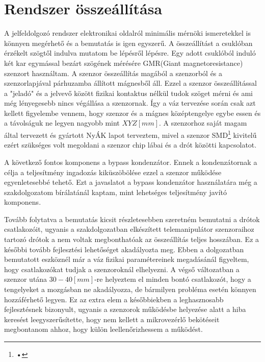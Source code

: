 \section{Rendszer összeállítása}

A jelfeldolgozó rendszer elektronikai oldalról minimális mérnöki ismeretekkel is könnyen megérhető és a bemutatás is igen egyszerű. A összeállítást a csuklóban érzékelt szögtől indulva mutatom be lépésről lépésre. Egy adott csuklóból induló két kar egymással bezárt szögének mérésére GMR(Giant magnetoresistance) szenzort használtam. A szenzor összeállítás magából a szenzorból és a szenzorlapjával párhuzamba állított mágnesből áll. Ezzel a szenzor összeállítással a "jeladó" és a jelvevő között fizikai kontaktus nélkül tudok szöget mérni és ami még lényegesebb nincs végállása a szenzornak. Így a váz tervezése során csak azt kellett figyelembe vennem, hogy szenzor és a mágnes középtengelye egybe essen és a távolságuk ne legyen nagyobb mint $XYZ[mm]$. A szenzorhoz saját magam által tervezett és gyártott NyÁK lapot terveztem, mivel a szenzor SMD\footnote{•} kivitelű ezért szükséges volt megoldani a szenzor chip lábai és a drót közötti kapcsolatot.


A következő fontos komponens a bypass kondenzátor. Ennek a kondenzátornak a célja a teljesítmény ingadozás kiküszöbölése ezzel a szenzor működése egyenletesebbé tehető. Ezt a javaslatot a bypass kondenzátor használatára még a szakdolgozatom bírálatánál kaptam, mint lehetséges teljesítmény javító komponens.

Tovább folytatva a bemutatás kicsit részletesebben szeretném bemutatni a drótok csatlakozóit, ugyanis a szakdolgozatban elkészített telemanipulátor szenzoraihoz tartozó drótok a nem voltak megbonthatóak az összeállítás teljes hosszában. Ez a későbbi tovább fejlesztési lehetőséget akadályozta meg. Ebben a dolgozatban bemutatott eszköznél már a váz fizikai paramétereinek megadásánál figyeltem, hogy csatlakozókat tudjak a szenzoroknál elhelyezni. A végső változatban a szenzor utána $30-40[mm]$-re helyeztem el minden bontó csatlakozót, hogy a tengelyeket a mozgásban ne akadályozza, de bármilyen probléma esetén könnyen hozzáférhető legyen. Ez az extra elem a későbbiekben a leghasznosabb fejlesztésnek bizonyult, ugyanis a szenzorok működésbe helyezése alatt a hiba keresést leegyszerűsítette, hogy nem kellett a mikrovezérlő bekötéseit megbontanom ahhoz, hogy külön leellenőrizhessem a működést.

